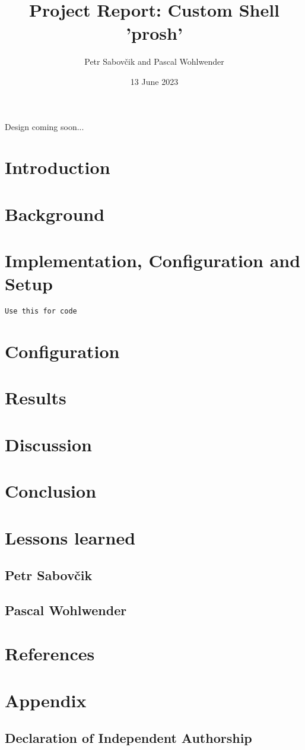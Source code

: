 \documentclass{article}
\title{Project Report: Custom Shell 'prosh'}
\date{13 June 2023}
\author{Petr Sabovčik and Pascal Wohlwender}
\begin{document}
\begin{titlepage}
	\maketitle
	Design coming soon...
\end{titlepage}

\tableofcontents
\pagebreak

\section{Introduction}

\section{Background}

\section{Implementation, Configuration and Setup}
\begin{lstlisting}[firstnumber=10]
Use this for code
\end{lstlisting}

\section{Configuration}

\section{Results}

\section{Discussion}

\section{Conclusion}

\section{Lessons learned}
\subsection{Petr Sabovčik}
\subsection{Pascal Wohlwender}

\section{References}

\pagebreak

\section{Appendix}

\subsection{Declaration of Independent Authorship}
\end{document}
